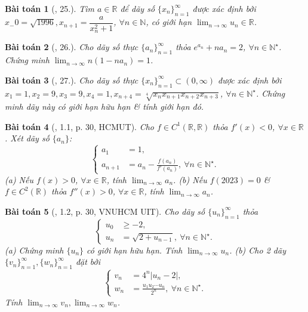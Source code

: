\documentclass[oneside]{book}
\newtheorem{baitoan}{Bài toán}
\begin{document}
\begin{baitoan}[\cite{TLCT_dai_so_giai_tich_11}, 25.]
	Tìm $a\in\mathbb{R}$ để dãy số $\{x_n\}_{n=1}^\infty$ được xác định bởi $x_-0 = \sqrt{1996},x_{n+1} = \dfrac{a}{x_n^2 + 1}$, $\forall n\in\mathbb{N}$, có giới hạn $\lim_{n\to\infty} u_n\in\mathbb{R}$.
\end{baitoan}

\begin{baitoan}[\cite{TLCT_dai_so_giai_tich_11}, 26.]
	Cho dãy số thực $\{a_n\}_{n=1}^\infty$ thỏa $e^{a_n} + na_n = 2$, $\forall n\in\mathbb{N}^\star$. Chứng minh $\lim_{n\to\infty} n(1 - na_n) = 1$.
\end{baitoan}

\begin{baitoan}[\cite{TLCT_dai_so_giai_tich_11}, 27.]
	Cho dãy số thực $\{x_n\}_{n=1}^\infty\subset(0,\infty)$ được xác định bởi $x_1 = 1,x_2 = 9,x_3 = 9,x_4 = 1,x_{n+4} = \sqrt[4]{x_nx_{n+1}x_{n+2}x_{n+3}}$, $\forall n\in\mathbb{N}^\star$. Chứng minh dãy này có giới hạn hữu hạn \& tính giới hạn đó.
\end{baitoan}

\begin{baitoan}[\cite{VMS_VMC2023}, 1.1, p. 30, HCMUT]
	Cho $f\in C^1(\mathbb{R},\mathbb{R})$ thỏa $f'(x) < 0$, $\forall x\in\mathbb{R}$. Xét dãy số $\{a_n\}$:
	\begin{equation*}
		\left\{\begin{split}
			a_1 &= 1,\\
			a_{n+1} &= a_n - \frac{f(a_n)}{f'(a_n)},\ \forall n\in\mathbb{N}^\star.
		\end{split}\right.
	\end{equation*}
	(a) Nếu $f(x) > 0$, $\forall x\in\mathbb{R}$, tính $\lim_{n\to\infty} a_n$. (b) Nếu $f(2023) = 0$ \& $f\in C^2(\mathbb{R})$ thỏa $f''(x) > 0$, $\forall x\in\mathbb{R}$, tính $\lim_{n\to\infty} a_n$.
\end{baitoan}

\begin{baitoan}[\cite{VMS_VMC2023}, 1.2, p. 30, VNUHCM UIT]
	Cho dãy số $\{u_n\}_{n=1}^\infty$ thỏa
	\begin{equation*}
		\left\{\begin{split}
			u_0&\ge-2,\\
			u_n &= \sqrt{2 + u_{n-1}},\ \forall n\in\mathbb{N}^\star.
		\end{split}\right.
	\end{equation*}
	(a) Chứng minh $\{u_n\}$ có giới hạn hữu hạn. Tính $\lim_{n\to\infty} u_n$. (b) Cho 2 dãy $\{v_n\}_{n=1}^\infty,\{w_n\}_{n=1}^\infty$ đặt bởi
	\begin{equation*}
		\left\{\begin{split}
			v_n &= 4^n|u_n - 2|,\\
			w_n &= \frac{u_1u_2\cdots u_n}{2^n},\ \forall n\in\mathbb{N}^\star.
		\end{split}\right.
	\end{equation*}
	Tính $\lim_{n\to\infty} v_n,\lim_{n\to\infty} w_n$.
\end{baitoan}
\end{document}
